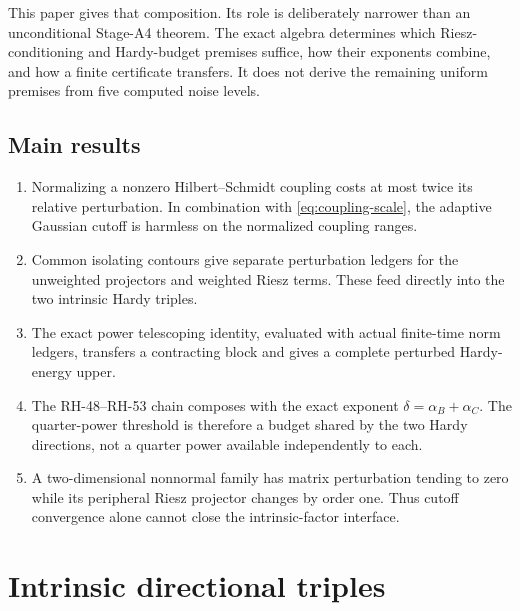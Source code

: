 \documentclass[11pt]{article}
\theoremstyle{definition}
\theoremstyle{remark}
\begin{document}
This paper gives that composition.  Its role is deliberately narrower than
an unconditional Stage-A4 theorem.  The exact algebra determines which
Riesz-conditioning and Hardy-budget premises suffice, how their exponents
combine, and how a finite certificate transfers.  It does not derive the
remaining uniform premises from five computed noise levels.

\subsection*{Main results}

\begin{enumerate}[leftmargin=2.2em]
 \item Normalizing a nonzero Hilbert--Schmidt coupling costs at most twice
 its relative perturbation.  In combination with
 \eqref{eq:coupling-scale}, the adaptive Gaussian cutoff is harmless on the
 normalized coupling ranges.

 \item Common isolating contours give separate perturbation ledgers for the
 unweighted projectors and weighted Riesz terms.  These feed directly into
 the two intrinsic Hardy triples.

 \item The exact power telescoping identity, evaluated with actual
 finite-time norm ledgers, transfers a contracting block and gives a
 complete perturbed Hardy-energy upper.

 \item The RH-48--RH-53 chain composes with the exact exponent
 $\delta=\alpha_B+\alpha_C$.  The quarter-power threshold is therefore a
 budget shared by the two Hardy directions, not a quarter power available
 independently to each.

 \item A two-dimensional nonnormal family has matrix perturbation tending
 to zero while its peripheral Riesz projector changes by order one.  Thus
 cutoff convergence alone cannot close the intrinsic-factor interface.
\end{enumerate}

\section{Intrinsic directional triples}
\end{document}
